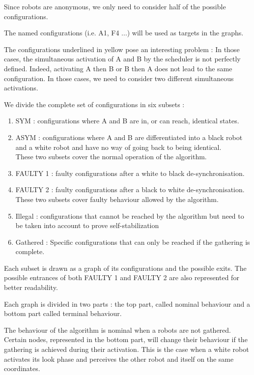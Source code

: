 \documentclass[11pt]{article}
\begin{document}
Since robots are anonymous, we only need to consider half of the possible configurations. 

The named configurations (i.e. A1, F4 ...) will be used as targets in the graphs. 

The configurations underlined in yellow pose an interesting problem :
In those cases, the simultaneous activation of A and B by the scheduler is not perfectly defined. Indeed, activating A then B or B then A does not lead to the same configuration. In those cases, we need to consider two different simultaneous activations.


We divide the complete set of configurations in six subsets :

\begin{enumerate}[label=(\alph*)]
\item SYM : configurations where A and B are in, or can reach, identical states.
\item ASYM : configurations where A and B are differentiated into a black robot and a white robot and have no way of going back to being identical.\\

These two subsets cover the normal operation of the algorithm.

\item FAULTY 1 : faulty configurations after a white to black de-synchronisation.
\item FAULTY 2 : faulty configurations after a black to white de-synchronisation.\\

These two subsets cover faulty behaviour allowed by the algorithm.

\item Illegal : configurations that cannot be reached by the algorithm but need to be taken into account to prove self-stabilization
\item Gathered : Specific configurations that can only be reached if the gathering is complete.
  

\end{enumerate}


Each subset is drawn as a graph of its configurations and the possible exits. The possible entrances of both FAULTY 1 and FAULTY 2 are also represented for better readability.

Each graph is divided in two parts : the top part, called nominal behaviour and a bottom part called terminal behaviour. 

The behaviour of the algorithm is nominal when a robots are not gathered. Certain nodes, represented in the bottom part, will change their behaviour if the gathering is achieved during their activation. This is the case when a white robot activates its look phase and perceives the other robot and itself on the same coordinates.
\end{document}
